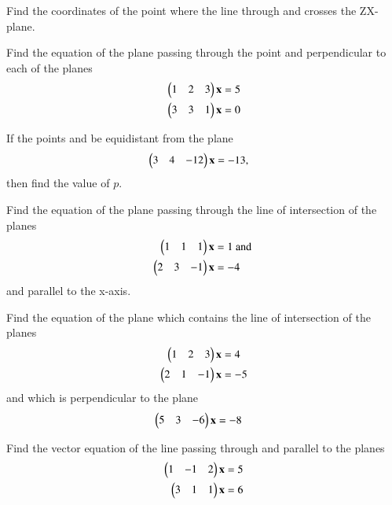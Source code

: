 \item Find the coordinates of the point where the line through  and  crosses the ZX-plane.
\\
\solution

%
\item Find the equation of the plane passing through the point  and perpendicular to each of the planes 
\begin{align}
\begin{pmatrix}1 & 2 & 3\end{pmatrix}\mathbf{x}&=5
\\
\begin{pmatrix}3 & 3 & 1\end{pmatrix}\mathbf{x}&=0
\end{align}
\item If the points  and  be equidistant from the plane 
\begin{align}
\begin{pmatrix}3 & 4 & -12\end{pmatrix}\mathbf{x}&=-13,
\end{align}
%
then find the value of $p$.
\item Find the equation of the plane passing through the line of intersection of the planes 
\begin{align}
\begin{pmatrix}1 & 1 & 1\end{pmatrix}\mathbf{x}&=1 \text{ and }
\\
\begin{pmatrix}2 & 3 & -1\end{pmatrix}\mathbf{x}&=-4
\end{align}
%
and parallel to the x-axis.
%
\\
\solution

\item Find the equation of the plane which contains the line of intersection of the planes 
%
\begin{align}
\begin{pmatrix}1 & 2 & 3\end{pmatrix}\mathbf{x}&=4 
\\
\begin{pmatrix}2 & 1 & -1\end{pmatrix}\mathbf{x}&=-5
\end{align}
%
and which is perpendicular to the plane 
\begin{align}
\begin{pmatrix}5 & 3 & -6\end{pmatrix}\mathbf{x}&=-8
\end{align}
%
\item Find the vector equation of the line passing through  and parallel to the planes 
%
\begin{align}
\begin{pmatrix}1 & -1 & 2\end{pmatrix}\mathbf{x}&=5
\\
\begin{pmatrix}3 & 1 & 1\end{pmatrix}\mathbf{x}&=6
\end{align}
%
\solution
%

